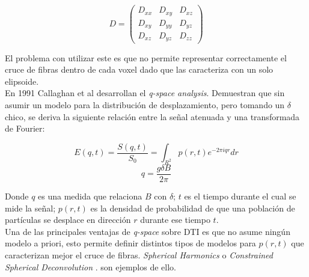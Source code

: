 $$
    D =
    \begin{pmatrix}
             D_{xx} & D_{xy} & D_{xz} \\
             D_{xy} & D_{yy} & D_{yz} \\
             D_{xz} & D_{yz} & D_{zz}    
    \end{pmatrix}
$$

\vspace{0.1cm}

El problema con utilizar este es que no permite representar correctamente
el cruce de fibras dentro de cada voxel dado que las caracteriza con un solo
elipsoide.\\

En 1991 Callaghan et al \cite{Callaghan1991} desarrollan el \textit{q-space analysis}.
Demuestran que sin asumir un modelo para la distribuci\'on de desplazamiento, 
pero tomando un $\delta$ chico, se deriva la siguiente relaci\'on entre la se\~nal
atenuada y una transformada de Fourier:

$$E(q,t) =  \frac{S(q,t)}{S_0} = \int_{R^2}{p(r,t)e^{-2\pi i q r} dr} $$
$$ q = \frac{g \delta B}{2\pi} $$

Donde $q$ es una medida que relaciona $B$ con $\delta$; $t$ es el tiempo durante
el cual se mide la se\~nal; $p(r,t)$ es la densidad de probabilidad de que una
poblaci\'on de part\'iculas se desplace en direcci\'on $r$ durante ese tiempo $t$.\\

Una de las principales ventajas de \textit{q-space} sobre DTI es que no asume
ning\'un modelo a priori, esto permite definir distintos tipos de modelos para
$p(r,t)$ que caracterizan mejor el cruce de fibras. \textit{Spherical Harmonics}
\cite{Tuch2004} o \textit{Constrained Spherical Deconvolution} \cite{Tournier2004}.
son ejemplos de ello. \\

